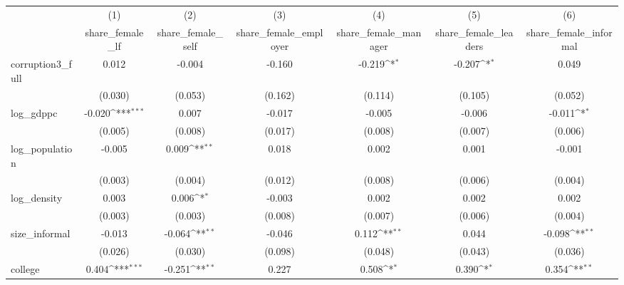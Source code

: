 {
\def\sym#1{\ifmmode^{#1}\else\(^{#1}\)\fi}
\begin{tabular}{l*{6}{c}}
\hline\hline
            &\multicolumn{1}{c}{(1)}&\multicolumn{1}{c}{(2)}&\multicolumn{1}{c}{(3)}&\multicolumn{1}{c}{(4)}&\multicolumn{1}{c}{(5)}&\multicolumn{1}{c}{(6)}\\
            &\multicolumn{1}{c}{share\_female\_lf}&\multicolumn{1}{c}{share\_female\_self}&\multicolumn{1}{c}{share\_female\_employer}&\multicolumn{1}{c}{share\_female\_manager}&\multicolumn{1}{c}{share\_female\_leaders}&\multicolumn{1}{c}{share\_female\_informal}\\
\hline
corruption3\_full&       0.012         &      -0.004         &      -0.160         &      -0.219\sym{*}  &      -0.207\sym{*}  &       0.049         \\
            &     (0.030)         &     (0.053)         &     (0.162)         &     (0.114)         &     (0.105)         &     (0.052)         \\
[1em]
log\_gdppc   &      -0.020\sym{***}&       0.007         &      -0.017         &      -0.005         &      -0.006         &      -0.011\sym{*}  \\
            &     (0.005)         &     (0.008)         &     (0.017)         &     (0.008)         &     (0.007)         &     (0.006)         \\
[1em]
log\_population&      -0.005         &       0.009\sym{**} &       0.018         &       0.002         &       0.001         &      -0.001         \\
            &     (0.003)         &     (0.004)         &     (0.012)         &     (0.008)         &     (0.006)         &     (0.004)         \\
[1em]
log\_density &       0.003         &       0.006\sym{*}  &      -0.003         &       0.002         &       0.002         &       0.002         \\
            &     (0.003)         &     (0.003)         &     (0.008)         &     (0.007)         &     (0.006)         &     (0.004)         \\
[1em]
size\_informal&      -0.013         &      -0.064\sym{**} &      -0.046         &       0.112\sym{**} &       0.044         &      -0.098\sym{**} \\
            &     (0.026)         &     (0.030)         &     (0.098)         &     (0.048)         &     (0.043)         &     (0.036)         \\
[1em]
college     &       0.404\sym{***}&      -0.251\sym{**} &       0.227         &       0.508\sym{*}  &       0.390\sym{*}  &       0.354\sym{**} \\

\end{tabular}}
